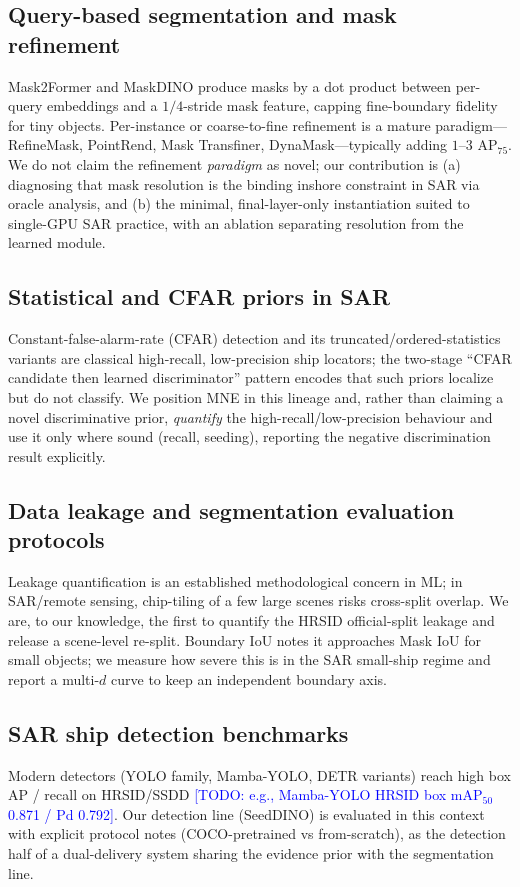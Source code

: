 \documentclass[journal]{IEEEtran}
\newcommand{\TODO}[1]{\textcolor{blue}{[TODO: #1]}}
\begin{document}
\subsection{Query-based segmentation and mask refinement}
Mask2Former and MaskDINO produce masks by a dot product between per-query embeddings and a $1/4$-stride mask feature, capping fine-boundary fidelity for tiny objects. Per-instance or coarse-to-fine refinement is a mature paradigm---RefineMask, PointRend, Mask Transfiner, DynaMask---typically adding $1$--$3$ AP$_{75}$. We do not claim the refinement \emph{paradigm} as novel; our contribution is (a) diagnosing that mask resolution is the binding inshore constraint in SAR via oracle analysis, and (b) the minimal, final-layer-only instantiation suited to single-GPU SAR practice, with an ablation separating resolution from the learned module.

\subsection{Statistical and CFAR priors in SAR}
Constant-false-alarm-rate (CFAR) detection and its truncated/ordered-statistics variants are classical high-recall, low-precision ship locators; the two-stage ``CFAR candidate then learned discriminator'' pattern encodes that such priors localize but do not classify. We position MNE in this lineage and, rather than claiming a novel discriminative prior, \emph{quantify} the high-recall/low-precision behaviour and use it only where sound (recall, seeding), reporting the negative discrimination result explicitly.

\subsection{Data leakage and segmentation evaluation protocols}
Leakage quantification is an established methodological concern in ML; in SAR/remote sensing, chip-tiling of a few large scenes risks cross-split overlap. We are, to our knowledge, the first to quantify the HRSID official-split leakage and release a scene-level re-split. Boundary IoU \cite{cheng2021boundary} notes it approaches Mask IoU for small objects; we measure how severe this is in the SAR small-ship regime and report a multi-$d$ curve to keep an independent boundary axis.

\subsection{SAR ship detection benchmarks}
Modern detectors (YOLO family, Mamba-YOLO, DETR variants) reach high box AP / recall on HRSID/SSDD \TODO{e.g., Mamba-YOLO HRSID box mAP$_{50}$ 0.871 / Pd 0.792}. Our detection line (SeedDINO) is evaluated in this context with explicit protocol notes (COCO-pretrained vs from-scratch), as the detection half of a dual-delivery system sharing the evidence prior with the segmentation line.
\end{document}
